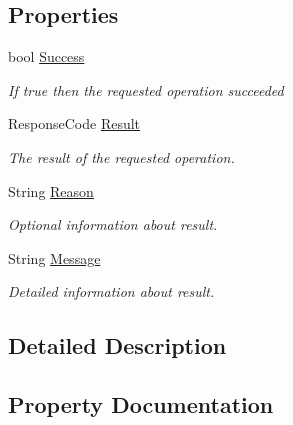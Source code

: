 \subsection*{Properties}
\begin{DoxyCompactItemize}
\item 
bool \hyperlink{classcom_1_1clover_1_1remotepay_1_1sdk_1_1_base_response_a26eb8731f844ac210c003aef421edcb0}{Success}
\begin{DoxyCompactList}\small\item\em If true then the requested operation succeeded \end{DoxyCompactList}\item 
Response\+Code \hyperlink{classcom_1_1clover_1_1remotepay_1_1sdk_1_1_base_response_a53831dfbfa294ff337b8e9f745e163ad}{Result}
\begin{DoxyCompactList}\small\item\em The result of the requested operation. \end{DoxyCompactList}\item 
String \hyperlink{classcom_1_1clover_1_1remotepay_1_1sdk_1_1_base_response_a7d7f71bc43c375b70016d9f024837ccc}{Reason}
\begin{DoxyCompactList}\small\item\em Optional information about result. \end{DoxyCompactList}\item 
String \hyperlink{classcom_1_1clover_1_1remotepay_1_1sdk_1_1_base_response_ac97b22a1e1f5a07482461a2b2557892c}{Message}
\begin{DoxyCompactList}\small\item\em Detailed information about result. \end{DoxyCompactList}\end{DoxyCompactItemize}


\subsection{Detailed Description}




\subsection{Property Documentation}
\mbox{\label{classcom_1_1clover_1_1remotepay_1_1sdk_1_1_base_response_ac97b22a1e1f5a07482461a2b2557892c}} 
